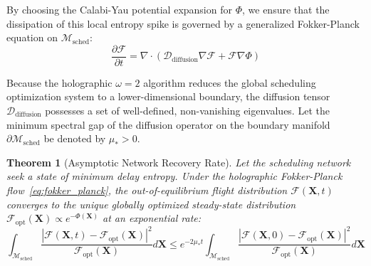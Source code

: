 \documentclass[11pt,a4paper]{book}
\newtheorem{theorem}{Theorem}
\begin{document}
By choosing the Calabi-Yau potential expansion for $\Phi$, we ensure that the dissipation of this local entropy spike is governed by a generalized Fokker-Planck equation on $\mathcal{M}_{\text{sched}}$:
\begin{equation}
\label{eq:fokker_planck}
\frac{\partial \mathcal{F}}{\partial t} = \nabla \cdot \left( \mathcal{D}_{\text{diffusion}} \nabla \mathcal{F} + \mathcal{F} \nabla \Phi \right)
\end{equation}

Because the holographic $\omega = 2$ algorithm reduces the global scheduling optimization system to a lower-dimensional boundary, the diffusion tensor $\mathcal{D}_{\text{diffusion}}$ possesses a set of well-defined, non-vanishing eigenvalues. Let the minimum spectral gap of the diffusion operator on the boundary manifold $\partial \mathcal{M}_{\text{sched}}$ be denoted by $\mu_* > 0$.

\begin{theorem}[Asymptotic Network Recovery Rate]
Let the scheduling network seek a state of minimum delay entropy. Under the holographic Fokker-Planck flow~\eqref{eq:fokker_planck}, the out-of-equilibrium flight distribution $\mathcal{F}(\mathbf{X}, t)$ converges to the unique globally optimized steady-state distribution $\mathcal{F}_{\text{opt}}(\mathbf{X}) \propto e^{-\Phi(\mathbf{X})}$ at an exponential rate:
\begin{equation}
\int_{\mathcal{M}_{\text{sched}}} \frac{|\mathcal{F}(\mathbf{X}, t) - \mathcal{F}_{\text{opt}}(\mathbf{X})|^2}{\mathcal{F}_{\text{opt}}(\mathbf{X})} d\mathbf{X} \le e^{-2 \mu_* t} \int_{\mathcal{M}_{\text{sched}}} \frac{|\mathcal{F}(\mathbf{X}, 0) - \mathcal{F}_{\text{opt}}(\mathbf{X})|^2}{\mathcal{F}_{\text{opt}}(\mathbf{X})} d\mathbf{X}
\end{equation}
\end{theorem}
\end{document}
